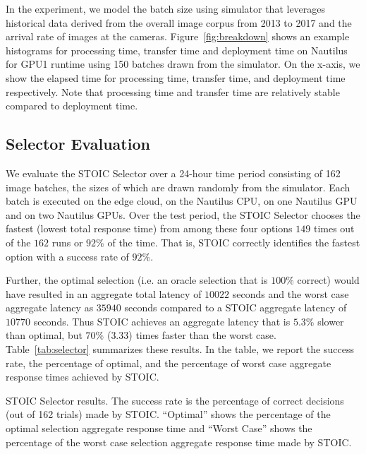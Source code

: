 In the experiment, we model the batch size using simulator that leverages
historical data derived from the overall image corpus from 2013 to 2017 and the
arrival rate of images at the cameras. Figure~\ref{fig:breakdown} shows an
example histograms for processing time, transfer time and deployment time on
Nautilus for GPU1 runtime using 150 batches drawn from the simulator. On the
x-axis, we show the elapsed time for processing time, transfer time, and
deployment time respectively.  Note that processing time and transfer time are
relatively stable compared to deployment time. 

\subsection{Selector Evaluation}

We evaluate the STOIC Selector over a 24-hour time period consisting of 162
image batches, the sizes of which are drawn randomly from the simulator. Each
batch is executed on the edge cloud, on the Nautilus CPU, on one Nautilus GPU
and on two Nautilus GPUs. Over the test period, the STOIC Selector chooses the
fastest (lowest total response time) from among these four options $149$ times
out of the $162$ runs or $92\%$ of the time. That is, STOIC correctly
identifies the fastest option with a success rate of $92\%$.

Further, the optimal selection (i.e. an oracle selection that is $100\%$
correct) would have resulted in an aggregate total latency of $10022$ seconds
and the worst case aggregate latency as $35940$ seconds compared to a STOIC
aggregate latency of $10770$ seconds.  Thus STOIC achieves an aggregate
latency that is $5.3\%$ slower than optimal, but $70\%$ ($3.33$) times faster
than the worst case. Table~\ref{tab:selector} summarizes these results. In the
table, we report the success rate, the percentage of optimal, and the
percentage of worst case aggregate response times achieved by STOIC. 

\begin{table}[t] 
\begin{centering}
\captionsetup{justification=centering}

\end{centering}
\caption{
STOIC Selector results. The success rate is the percentage of correct decisions
(out of 162 trials) made by STOIC.  ``Optimal'' shows the percentage of the
optimal selection aggregate response time and ``Worst Case'' shows the percentage of the worst case 
selection aggregate response time made by STOIC.}
\label{tab:selector}
\end{table}

